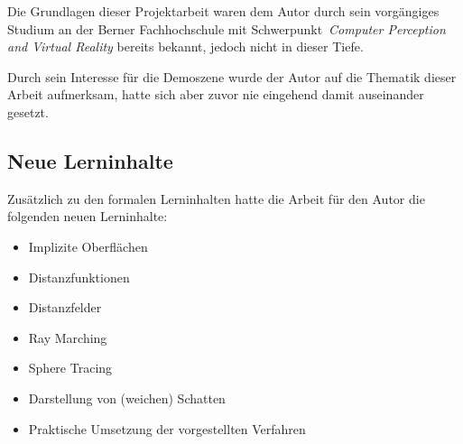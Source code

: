 Die Grundlagen dieser Projektarbeit waren dem Autor durch sein
vorgängiges Studium an der Berner Fachhochschule mit
Schwerpunkt~\textit{Computer Perception and Virtual Reality} bereits
bekannt, jedoch nicht in dieser Tiefe.

Durch sein Interesse für die Demoszene wurde der Autor auf die Thematik
dieser Arbeit aufmerksam, hatte sich aber zuvor nie eingehend damit
auseinander gesetzt.

\subsection{Neue Lerninhalte}
\label{subsec:new_learning_contents}

Zusätzlich zu den formalen Lerninhalten hatte die Arbeit für den Autor
die folgenden neuen Lerninhalte:
\begin{itemize}
    \item{Implizite Oberflächen}
    \item{Distanzfunktionen}
    \item{Distanzfelder}
    \item{Ray Marching}
    \item{Sphere Tracing}
    \item{Darstellung von (weichen) Schatten}
    \item{Praktische Umsetzung der vorgestellten Verfahren}
\end{itemize}

